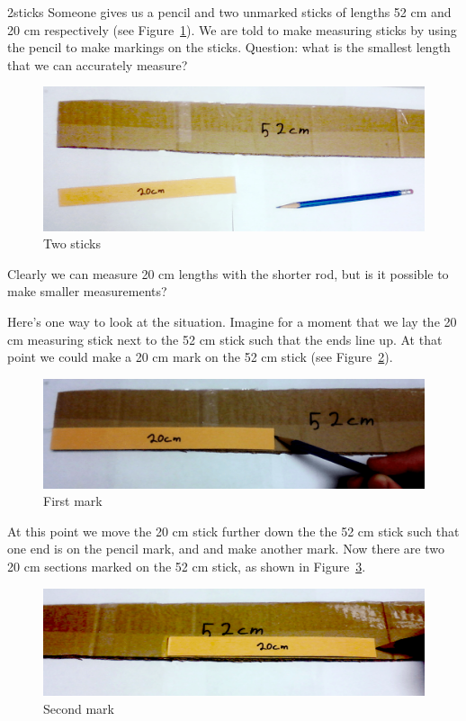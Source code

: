\begin{example}{2sticks} Someone gives us a pencil and two unmarked sticks of lengths 52 cm and  20 cm respectively (see Figure~\ref{fig:1euclidean}). We are told to make measuring sticks by using the pencil to make markings on the sticks. Question: what is the smallest length that we can accurately measure? 
\begin{figure}
\begin {center} 
\includegraphics[width=1.00\textwidth]{images/2_sticks_step1.png}
\end {center}
\caption{Two sticks\label{fig:1euclidean}}
\end{figure}
Clearly we can measure 20 cm lengths with the shorter rod, but is it possible to make smaller measurements?

Here's one way to look at the situation. Imagine for a moment that we lay the 20 cm measuring stick next to the 52 cm stick such that the ends line up.  At that point we could make a 20 cm mark on the 52 cm stick (see Figure~\ref{fig:2}).
\begin{figure}
\begin {center} 
\includegraphics[width=1.00\textwidth]{images/2_sticks_step2.png}
\end {center}
\caption{First mark\label{fig:2}}
\end{figure}

\noindent At this point we move the 20 cm stick further down the the 52 cm stick such that one end is on the pencil mark, and and make another mark.  Now there are two 20 cm sections marked on the 52 cm stick, 
as shown in Figure~\ref{fig:3}.  
\begin{figure}
\begin{center}
	\includegraphics[width=1.00\textwidth]{images/2_sticks_step3.png}
\end{center}
\caption{Second mark\label{fig:3}}
\end{figure}


\end{example}

